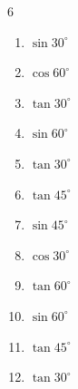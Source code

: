 \begin{multicols}{6}
\begin{enumerate}

  \item $\displaystyle \sin{30^\circ}$


  \item $\displaystyle \cos{60^\circ}$


  \item $\displaystyle \tan{30^\circ}$


  \item $\displaystyle \sin{60^\circ}$


  \item $\displaystyle \tan{30^\circ}$


  \item $\displaystyle \tan{45^\circ}$

        \phantom{$\displaystyle =1$}

  \item $\displaystyle \sin{45^\circ}$


  \item $\displaystyle \cos{30^\circ}$


  \item $\displaystyle \tan{60^\circ}$


  \item $\displaystyle \sin{60^\circ}$


  \item $\displaystyle \tan{45^\circ}$

        \phantom{$\displaystyle =1$}

  \item $\displaystyle \tan{30^\circ}$



\end{enumerate}
\end{multicols}
